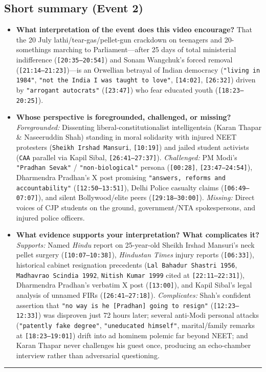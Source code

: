 \documentclass[10pt,a4paper]{article}
\begin{document}
\subsection*{Short summary (Event 2)}
\begin{itemize}[leftmargin=1.5em, itemsep=3pt, topsep=4pt]
  \item \textbf{What interpretation of the event does this video encourage?} That the 20 July lathi/tear-gas/pellet-gun crackdown on teenagers and 20-somethings marching to Parliament---after 25 days of total ministerial indifference (\texttt{[20:35--20:54]}) and Sonam Wangchuk's forced removal (\texttt{[21:14--21:23]})---is an Orwellian betrayal of Indian democracy (\texttt{"living in 1984"}, \texttt{"not the India I was taught to love"}, \texttt{[14:02]}, \texttt{[26:32]}) driven by \texttt{"arrogant autocrats"} (\texttt{[23:47]}) who fear educated youth (\texttt{[18:23--20:25]}).
  \item \textbf{Whose perspective is foregrounded, challenged, or missing?} \textit{Foregrounded:} Dissenting liberal-constitutionalist intelligentsia (Karan Thapar \& Naseeruddin Shah) standing in moral solidarity with injured NEET protesters (\texttt{Sheikh Irshad Mansuri}, \texttt{[10:19]}) and jailed student activists (\texttt{CAA} parallel via Kapil Sibal, \texttt{[26:41--27:37]}). \textit{Challenged:} PM Modi's \texttt{"Pradhan Sevak"} / \texttt{"non-biological"} persona (\texttt{[00:28]}, \texttt{[23:47--24:54]}), Dharmendra Pradhan's X post promising \texttt{"answers, reforms and accountability"} (\texttt{[12:50--13:51]}), Delhi Police casualty claims (\texttt{[06:49--07:07]}), and silent Bollywood/elite peers (\texttt{[29:18--30:00]}). \textit{Missing:} Direct voices of CJP students on the ground, government/NTA spokespersons, and injured police officers.
  \item \textbf{What evidence supports your interpretation? What complicates it?} \textit{Supports:} Named \textit{Hindu} report on 25-year-old Sheikh Irshad Mansuri's neck pellet surgery (\texttt{[10:07--10:38]}), \textit{Hindustan Times} injury reports (\texttt{[06:33]}), historical cabinet resignation precedents (\texttt{Lal Bahadur Shastri 1956}, \texttt{Madhavrao Scindia 1992}, \texttt{Nitish Kumar 1999} cited at \texttt{[22:11--22:31]}), Dharmendra Pradhan's verbatim X post (\texttt{[13:00]}), and Kapil Sibal's legal analysis of unnamed FIRs (\texttt{[26:41--27:18]}). \textit{Complicates:} Shah's confident assertion that \texttt{"no way is he [Pradhan] going to resign"} (\texttt{[12:23--12:33]}) was disproven just 72 hours later; several anti-Modi personal attacks (\texttt{"patently fake degree"}, \texttt{"uneducated himself"}, marital/family remarks at \texttt{[18:23--19:01]}) drift into ad hominem polemic far beyond NEET; and Karan Thapar never challenges his guest once, producing an echo-chamber interview rather than adversarial questioning.
\end{itemize}
\vspace{4pt}\noindent\rule{\textwidth}{0.4pt}\vspace{4pt}
\end{document}

